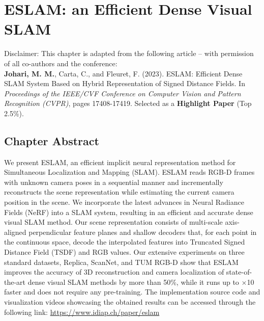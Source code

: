 \chapter{ESLAM: an Efficient Dense Visual SLAM} \label{sec:chapter4}

\begin{tcolorbox}[colback=gray!20, boxrule=1pt, colframe=black]
  Disclaimer: This chapter is adapted from the following article – with permission of all co-authors and the conference: \\

    \textbf{Johari, M. M.}, Carta, C., and Fleuret, F. (2023). ESLAM: Efficient Dense SLAM System Based on Hybrid Representation of Signed Distance Fields. In \textit{Proceedings of the IEEE/CVF Conference on Computer Vision and Pattern Recognition (CVPR)}, pages 17408-17419. Selected as a \textbf{Highlight Paper} (Top 2.5\%).
\end{tcolorbox}

\section{Chapter Abstract}

We present ESLAM, an efficient implicit neural representation method for Simultaneous Localization and Mapping (SLAM). ESLAM reads RGB-D frames with unknown camera poses in a sequential manner and incrementally reconstructs the scene representation while estimating the current camera position in the scene. We incorporate the latest advances in Neural Radiance Fields (NeRF) into a SLAM system, resulting in an efficient and accurate dense visual SLAM method. Our scene representation consists of multi-scale axis-aligned perpendicular feature planes and shallow decoders that, for each point in the continuous space, decode the interpolated features into Truncated Signed Distance Field (TSDF) and RGB values. Our extensive experiments on three standard datasets, Replica, ScanNet, and TUM RGB-D show that ESLAM improves the accuracy of 3D reconstruction and camera localization of state-of-the-art dense visual SLAM methods by more than 50\%, while it runs up to $\times$10 faster and does not require any pre-training. The implementation source code and visualization videos showcasing the obtained results can be accessed through the following link: \href{https://www.idiap.ch/paper/eslam}{https://www.idiap.ch/paper/eslam}

